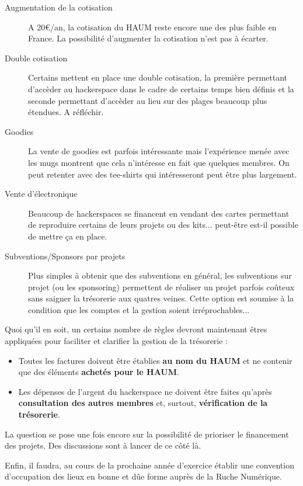 \documentclass[a4paper, 11pt]{article}
\begin{document}
\begin{description}
	\item[Augmentation de la cotisation] A 20\euro{}/an, la cotisation du HAUM reste encore une des plus faible en France. La
		possibilité d'augmenter la cotisation n'est pas à écarter.
	\item[Double cotisation] Certains mettent en place une double cotisation, la première permettant d'accèder au
		hackerspace dans le cadre de certains temps bien définis et la seconde permettant d'accèder au lieu sur des
		plages beaucoup plus étendues. A réfléchir.
	\item[Goodies] La vente de goodies est parfois intéressante mais l'expérience menée avec les mugs montrent que cela
		n'intéresse en fait que quelques membres. On peut retenter avec des tee-shirts qui intéresseront peut être plus
		largement.
	\item[Vente d'électronique] Beaucoup de hackerspaces se financent en vendant des cartes permettant de reproduire
		certains de leurs projets ou des kits... peut-être est-il possible de mettre ça en place.
	\item[Subventions/Sponsors par projets] Plus simples à obtenir que des subventions en général, les subventions sur
		projet (ou les sponsoring) permettent de réaliser un projet parfois coûteux sans saigner la trésorerie aux
		quatres veines. Cette option est soumise à la condition que les comptes et la gestion soient
		irréprochables...
\end{description}

Quoi qu'il en soit, un certains nombre de règles devront maintenant êtres appliquées pour faciliter et clarifier la
gestion de la trésorerie :

\begin{itemize}
	\item Toutes les factures doivent être établies \textbf{au nom du HAUM} et ne contenir que des éléments
		\textbf{achetés pour le HAUM}.
	\item Les dépenses de l'argent du hackerspace ne doivent être faites qu'après \textbf{consultation des autres
		membres} et, surtout, \textbf{vérification de la trésorerie}.
\end{itemize}

La question se pose une fois encore sur la possibilité de prioriser le financement des projets. Des discussions sont à
lancer de ce côté là.

Enfin, il faudra, au cours de la prochaine année d'exercice établir une convention d'occupation des lieux en bonne et dûe
forme auprès de la Ruche Numérique.
\end{document}
